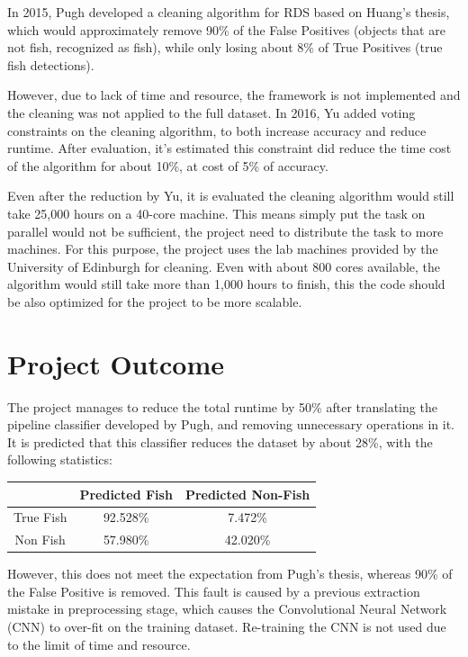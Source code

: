 \documentclass[bsc,logo,twoside,fullspacing,parskip]{infthesis}
\begin{document}
In 2015, Pugh\cite{Pugh} developed a cleaning algorithm for RDS based on Huang's thesis\cite{Huang}, which would approximately remove 90\% of the False Positives (objects that are not fish, recognized as fish), while only losing about 8\% of True Positives (true fish detections). 

However, due to lack of time and resource, the framework is not implemented and the cleaning was not applied to the full dataset.
In 2016, Yu\cite{Yu} added voting constraints on the cleaning algorithm, to both increase accuracy and reduce runtime. 
After evaluation, it's estimated this constraint did reduce the time cost of the algorithm for about 10\%, at cost of 5\% of accuracy.

Even after the reduction by Yu, it is evaluated the cleaning algorithm would still take 25,000 hours on a 40-core machine\cite{Yu}.
This means simply put the task on parallel would not be sufficient, the project need to distribute the task to more machines.
For this purpose, the project uses the lab machines provided by the University of Edinburgh for cleaning. 
Even with about 800 cores available, the algorithm would still take more than 1,000 hours to finish, this the code should be also optimized for the project to be more scalable.

\section{Project Outcome}

The project manages to reduce the total runtime by 50\% after translating the pipeline classifier developed by Pugh\cite{Pugh}, and removing unnecessary operations in it. 
It is predicted that this classifier reduces the dataset by about 28\%, with the following statistics:

\begin{center}
\begin{tabular}{ |c|c|c| }
\hline 
$ $ & Predicted Fish & Predicted Non-Fish \\
\hline 
True Fish & 92.528\% & 7.472\% \\
Non Fish & 57.980\% & 42.020\% \\
\hline 
\end{tabular}
\end{center}

However, this does not meet the expectation from Pugh's thesis, whereas 90\% of the False Positive is removed. 
This fault is caused by a previous extraction mistake in preprocessing stage, which causes the Convolutional Neural Network (CNN) to over-fit on the training dataset. 
Re-training the CNN is not used due to the limit of time and resource.
\end{document}
